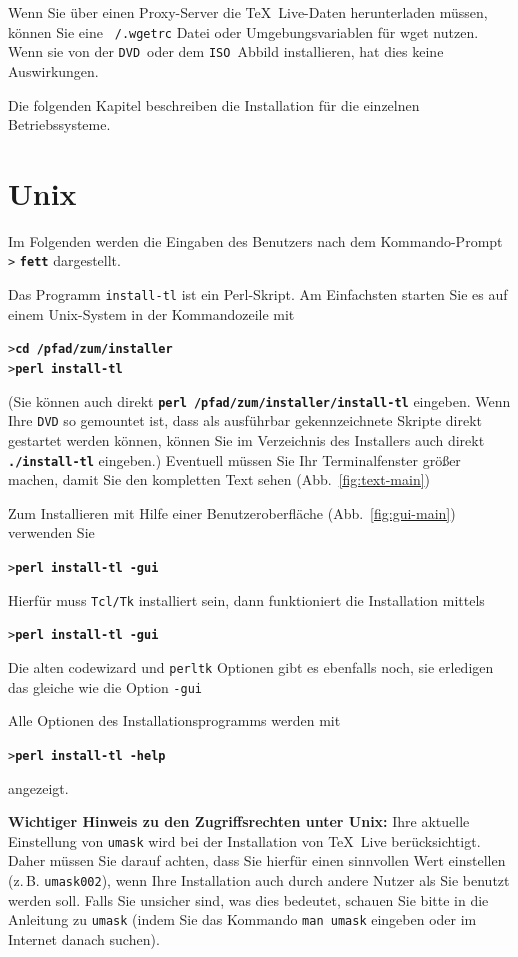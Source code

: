 \documentclass[12pt,ngerman,a4paper,fullparskip]{scrreprt}
\newcommand{\TL}{\TeX\ Live\xspace}
\newcommand{\acro}[1]{\texttt{#1}}
\newcommand{\code}[1]{\texttt{#1}}
\newcommand{\filename}[1]{\texttt{#1}}
\newcommand{\dirname}[1]{\texttt{#1}}
\newcommand{\samp}[1]{\texttt{#1}}
\newcommand{\Ucom}[1]{\textbf{\texttt{#1}}}
\providecommand*{\DVD}{\acro{DVD}\xspace}
\providecommand*{\ISO}{\acro{ISO}\xspace}
\begin{document}
Wenn Sie über einen Proxy-Server die \TL-Daten herunterladen müssen, können Sie eine \filename{~/.wgetrc} Datei oder Umgebungsvariablen für wget nutzen. Wenn sie von der \DVD\ oder dem \ISO\ Abbild installieren, hat dies keine Auswirkungen.


Die folgenden Kapitel beschreiben die Installation für die einzelnen Betriebssysteme.

\section{Unix}

Im Folgenden werden die Eingaben des Benutzers nach dem Kommando-Prompt \samp{>} \Ucom{fett} dargestellt.

Das Programm \filename{install-tl} ist ein Perl-Skript. Am Einfachsten starten
Sie es auf einem Unix-System in der Kommandozeile mit
\begin{alltt}
> \Ucom{cd /pfad/zum/installer}
> \Ucom{perl install-tl}
\end{alltt}

(Sie können auch direkt \Ucom{perl /pfad/zum/installer/install-tl} eingeben. Wenn Ihre \DVD so gemountet ist, dass als ausführbar gekennzeichnete Skripte direkt gestartet werden können, können Sie im Verzeichnis des Installers auch direkt \Ucom{./install-tl} eingeben.) Eventuell müssen Sie Ihr Terminalfenster größer machen, damit Sie den kompletten Text sehen (Abb.~\ref{fig:text-main})

Zum Installieren mit Hilfe einer Benutzeroberfläche (Abb.~\ref{fig:gui-main}) verwenden Sie

\begin{alltt}
> \Ucom{perl install-tl -gui}
\end{alltt}

Hierfür muss \dirname{Tcl/Tk} installiert sein, dann funktioniert die Installation mittels

\begin{alltt}
> \Ucom{perl install-tl -gui}
\end{alltt}

Die alten code{wizard} und \code{perltk} Optionen gibt es ebenfalls noch, sie erledigen das gleiche wie die Option \code{-gui}

Alle Optionen des Installationsprogramms werden mit
\begin{alltt}
> \Ucom{perl install-tl -help}
\end{alltt}
angezeigt.

\textbf{Wichtiger Hinweis zu den Zugriffsrechten unter Unix:} Ihre aktuelle Einstellung von \code{umask} wird bei der Installation von \TL berücksichtigt.  Daher müssen Sie darauf achten, dass Sie hierfür einen sinnvollen Wert einstellen (z.\,B. \code{umask002}), wenn Ihre Installation auch durch andere Nutzer als Sie benutzt werden soll. Falls Sie unsicher sind, was dies bedeutet, schauen Sie bitte in die Anleitung zu \code{umask} (indem Sie das Kommando \code{man umask} eingeben oder im Internet danach suchen).
\end{document}
